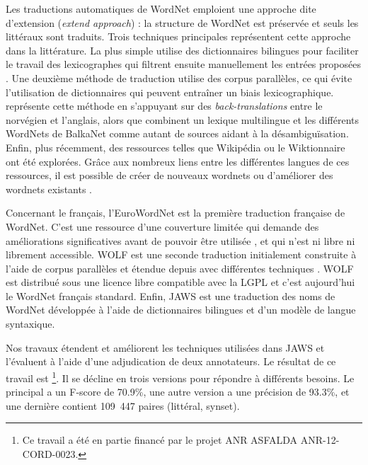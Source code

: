 Les traductions automatiques de WordNet emploient une approche dite d'extension (\textit{extend approach}) : la structure de WordNet est préservée et seuls les littéraux sont traduits. Trois techniques principales représentent cette approche dans la littérature. La plus simple utilise des dictionnaires bilingues pour faciliter le travail des lexicographes qui filtrent ensuite manuellement les entrées proposées \citep{vossen1998eurowordnet,pianta2002developing,tufis2004balkanet}. Une deuxième méthode de traduction utilise des corpus parallèles, ce qui évite l'utilisation de dictionnaires qui peuvent entraîner un biais lexicographique. \cite{dyvik2004translations} représente cette méthode en s'appuyant sur des \textit{back-translations} entre le norvégien et l'anglais, alors que \citep{sagot2008construction} combinent un lexique multilingue et les différents WordNets de BalkaNet comme autant de sources aidant à la désambiguïsation. Enfin, plus récemment, des ressources telles que Wikipédia ou le Wiktionnaire ont été explorées. Grâce aux nombreux liens entre les différentes langues de ces ressources, il est possible de créer de nouveaux wordnets \citep{melo2009towards,navigli2010babelnet} ou d'améliorer des wordnets existants \citep{hanoka2012wordnet}.

Concernant le français, l'EuroWordNet \citep{vossen1998eurowordnet} est la première traduction française de WordNet. C'est une ressource d'une couverture limitée qui demande des améliorations significatives avant de pouvoir être utilisée \citep{jacquin2006systemes}, et qui n'est ni libre ni librement accessible. WOLF est une seconde traduction initialement construite à l'aide de corpus parallèles \citep{sagot2008construction} et étendue depuis avec différentes techniques \citep{apidianaki2012applying}. WOLF est distribué sous une licence libre compatible avec la LGPL et c'est aujourd'hui le WordNet français standard. Enfin, JAWS \citep{mouton2010jaws} est une traduction des noms de WordNet développée à l'aide de dictionnaires bilingues et d'un modèle de langue syntaxique.

Nos travaux étendent et améliorent les techniques utilisées dans JAWS et l'évaluent à l'aide d'une adjudication de deux annotateurs. Le résultat de ce travail est \newjaws{}\footnote{Ce travail a été en partie financé par le projet ANR ASFALDA ANR-12-CORD-0023.}. Il se décline en trois versions pour répondre à différents besoins. Le \newjaws{} principal a un F-score de 70.9\%, une autre version a une précision de 93.3\%, et une dernière contient 109~447 paires (littéral, synset).

